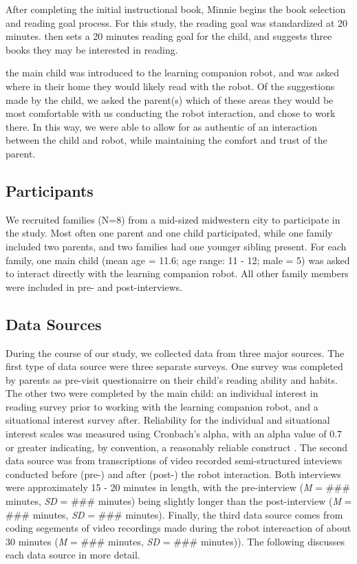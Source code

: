 \documentclass{sigchi}
\begin{document}
After completing the initial instructional book, Minnie begins the book selection and reading goal process.  For this study, the reading goal was standardized at 20 minutes.
 then sets a 20 minutes reading goal for the child, and suggests three books they may be interested in reading.  

the main child was introduced to the learning companion robot, and was asked where in their home they would likely read with the robot.  Of the suggestions made by the child, we asked the parent(s) which of these areas they would be most comfortable with us conducting the robot interaction, and chose to work there.  In this way, we were able to allow for as authentic of an interaction between the child and robot, while maintaining the comfort and trust of the parent. 

\subsection{Participants}
 We recruited families (N=8) from a mid-sized midwestern city to participate in the study. Most often one parent and one child participated, while one family included two parents, and two families had one younger sibling present. For each family, one main child (mean age = 11.6; age range: 11 - 12; male = 5) was asked to interact directly with the learning companion robot.  All other family members were included in pre- and post-interviews.
 
  
\subsection{Data Sources}
  During the course of our study, we collected data from three major sources.  The first type of data source were three separate surveys.  One survey was completed by parents as pre-visit questionairre on their child's reading ability and habits.  The other two were completed by the main child: an individual interest in reading survey prior to working with the learning companion robot, and a situational interest survey after.  Reliability for the individual and situational interest scales was measured using Cronbach’s alpha, with an alpha value of 0.7 or greater indicating, by convention, a reasonably reliable construct \cite{Crocker:2009}.  The second data source was from transcriptions of video recorded semi-structured inteviews conducted before (pre-) and after (post-) the robot interaction. Both interviews were approximately 15 - 20 minutes in length, with the pre-interview (\textit{M} = \#\#\# minutes, \textit{SD} = \#\#\# minutes) being slightly longer than the post-interview (\textit{M} = \#\#\# minutes, \textit{SD} = \#\#\# minutes). Finally, the third data source comes from coding segements of video recordings made during the robot intereaction of about 30 minutes (\textit{M} = \#\#\# minutes, \textit{SD} = \#\#\# minutes)).  The following discusses each data source in more detail.
  
\end{document}

